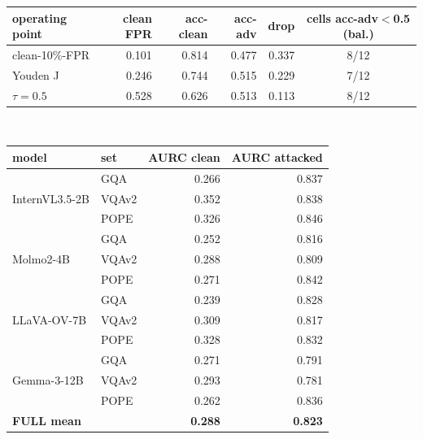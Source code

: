 \footnotesize
\setlength{\tabcolsep}{6pt}
\begin{tabular}{@{}lrrrrc@{}}
\toprule
operating point & clean FPR & acc-clean & acc-adv & drop & cells acc-adv$<$0.5 (bal.) \\
\midrule
clean-10\%-FPR & 0.101 & 0.814 & 0.477 & 0.337 & 8/12 \\
Youden J & 0.246 & 0.744 & 0.515 & 0.229 & 7/12 \\
$\tau{=}0.5$ & 0.528 & 0.626 & 0.513 & 0.113 & 8/12 \\
\bottomrule
\end{tabular}

\vspace{8pt}
\\[2pt]
\footnotesize
\setlength{\tabcolsep}{6pt}
\begin{tabular}{@{}llrr@{}}
\toprule
model & set & AURC clean & AURC attacked \\
\midrule
\multirow{3}{*}{InternVL3.5-2B} & GQA & 0.266 & 0.837 \\
 & VQAv2 & 0.352 & 0.838 \\
 & POPE & 0.326 & 0.846 \\
\midrule
\multirow{3}{*}{Molmo2-4B} & GQA & 0.252 & 0.816 \\
 & VQAv2 & 0.288 & 0.809 \\
 & POPE & 0.271 & 0.842 \\
\midrule
\multirow{3}{*}{LLaVA-OV-7B} & GQA & 0.239 & 0.828 \\
 & VQAv2 & 0.309 & 0.817 \\
 & POPE & 0.328 & 0.832 \\
\midrule
\multirow{3}{*}{Gemma-3-12B} & GQA & 0.271 & 0.791 \\
 & VQAv2 & 0.293 & 0.781 \\
 & POPE & 0.262 & 0.836 \\
\midrule
\textbf{FULL mean} & & \textbf{0.288} & \textbf{0.823} \\
\bottomrule
\end{tabular}

\vspace{3pt}

